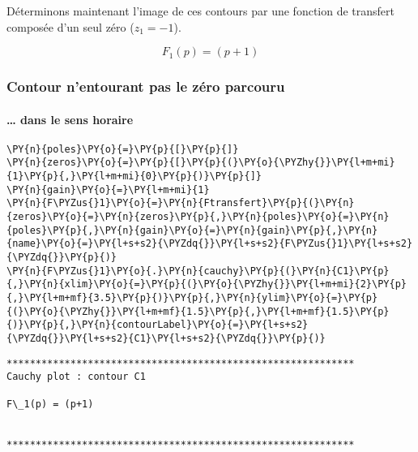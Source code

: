 Déterminons maintenant l'image de ces contours par une fonction de
transfert composée d'un seul zéro (\(z_1=-1\)).

\[
F_1(p)=(p+1)
\]

\hypertarget{contour-nentourant-pas-le-zuxe9ro-parcouru}{%
\subsubsection{Contour n'entourant pas le zéro
parcouru}\label{contour-nentourant-pas-le-zuxe9ro-parcouru}}

\hypertarget{dans-le-sens-horaire}{%
\paragraph{\ldots{} dans le sens horaire}\label{dans-le-sens-horaire}}

    \begin{tcolorbox}[breakable, size=fbox, boxrule=1pt, pad at break*=1mm,colback=cellbackground, colframe=cellborder]
\begin{Verbatim}[commandchars=\\\{\}]
\PY{n}{poles}\PY{o}{=}\PY{p}{[}\PY{p}{]}
\PY{n}{zeros}\PY{o}{=}\PY{p}{[}\PY{p}{(}\PY{o}{\PYZhy{}}\PY{l+m+mi}{1}\PY{p}{,}\PY{l+m+mi}{0}\PY{p}{)}\PY{p}{]}
\PY{n}{gain}\PY{o}{=}\PY{l+m+mi}{1}
\PY{n}{F\PYZus{}1}\PY{o}{=}\PY{n}{Ftransfert}\PY{p}{(}\PY{n}{zeros}\PY{o}{=}\PY{n}{zeros}\PY{p}{,}\PY{n}{poles}\PY{o}{=}\PY{n}{poles}\PY{p}{,}\PY{n}{gain}\PY{o}{=}\PY{n}{gain}\PY{p}{,}\PY{n}{name}\PY{o}{=}\PY{l+s+s2}{\PYZdq{}}\PY{l+s+s2}{F\PYZus{}1}\PY{l+s+s2}{\PYZdq{}}\PY{p}{)}
\PY{n}{F\PYZus{}1}\PY{o}{.}\PY{n}{cauchy}\PY{p}{(}\PY{n}{C1}\PY{p}{,}\PY{n}{xlim}\PY{o}{=}\PY{p}{(}\PY{o}{\PYZhy{}}\PY{l+m+mi}{2}\PY{p}{,}\PY{l+m+mf}{3.5}\PY{p}{)}\PY{p}{,}\PY{n}{ylim}\PY{o}{=}\PY{p}{(}\PY{o}{\PYZhy{}}\PY{l+m+mf}{1.5}\PY{p}{,}\PY{l+m+mf}{1.5}\PY{p}{)}\PY{p}{,}\PY{n}{contourLabel}\PY{o}{=}\PY{l+s+s2}{\PYZdq{}}\PY{l+s+s2}{C1}\PY{l+s+s2}{\PYZdq{}}\PY{p}{)}
\end{Verbatim}
\end{tcolorbox}

    \begin{Verbatim}[commandchars=\\\{\}]
************************************************************
Cauchy plot : contour C1

F\_1(p) = (p+1)


************************************************************

    \end{Verbatim}

